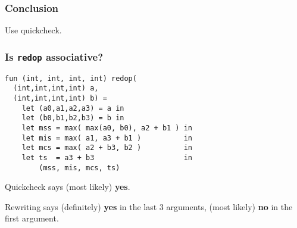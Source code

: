 \begin{frame}[plain]

\frametitle{Conclusion}

\begin{center}
Use quickcheck.
\end{center}

\end{frame}

\begin{frame}

\frametitle{Is \texttt{redop} associative?}

\begin{verbatim}
fun (int, int, int, int) redop(
  (int,int,int,int) a, 
  (int,int,int,int) b) =
    let (a0,a1,a2,a3) = a in
    let (b0,b1,b2,b3) = b in
    let mss = max( max(a0, b0), a2 + b1 ) in
    let mis = max( a1, a3 + b1 )          in
    let mcs = max( a2 + b3, b2 )          in
    let ts  = a3 + b3                     in
        (mss, mis, mcs, ts)
\end{verbatim}

Quickcheck says (most likely) \textbf{yes}.

Rewriting says (definitely) \textbf{yes} in the last 3 arguments, (most likely)
\textbf{no} in the first argument.

\end{frame}

